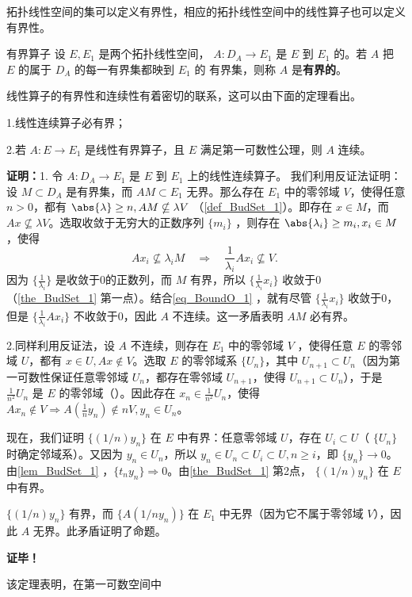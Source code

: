 

\cite{Ke1}拓扑线性空间的集可以定义有界性，相应的拓扑线性空间中的线性算子也可以定义有界性。

\begin{definition}{有界算子}
设 $E,E_1$ 是两个拓扑线性空间， $A:D_A\rightarrow E_1$ 是 $E$ 到 $E_1$ 的。若 $A$ 把 $E$ 的属于 $D_A$ 的每一有界集都映到 $E_1$ 的 有界集，则称 $A$ 是\textbf{有界的}。
\end{definition}

线性算子的有界性和连续性有着密切的联系，这可以由下面的定理看出。

\begin{theorem}{}
1.线性连续算子必有界；

2.若 $A:E\rightarrow E_1$ 是线性有界算子，且 $E$ 满足第一可数性公理，则 $A$ 连续。
\end{theorem}
\textbf{证明：}1. 令 $A:D_A\rightarrow E_1$ 是 $E$ 到 $E_1$ 上的线性连续算子。 我们利用反证法证明：设 $M\subset D_A$ 是有界集，而 $AM\subset E_1$ 无界。那么存在 $E_1$ 中的零邻域 $V$，使得任意 $n>0$，都有 $\abs{\lambda}\geq n,AM\nsubseteq\lambda V$ （\autoref{def_BudSet_1}）。即存在 $x\in M$，而 $Ax\nsubseteq \lambda V$。选取收敛于无穷大的正数序列 $\{m_i\}$ ，则存在 $\abs{\lambda_i}\geq m_i,x_i\in M$，使得 
\begin{equation}\label{eq_BoundO_1}
Ax_i\nsubseteq \lambda_iM\quad\Rightarrow\quad \frac{1}{\lambda_i}A x_i\nsubseteq V. ~
\end{equation}
因为 $\{\frac{1}{\lambda_i}\}$ 是收敛于0的正数列，而 $M$ 有界，所以 $\{\frac{1}{\lambda_i}x_i\}$ 收敛于0（\autoref{the_BudSet_1} 第一点）。结合\autoref{eq_BoundO_1} ，就有尽管 $\{\frac{1}{\lambda_i}x_i\}$ 收敛于0，但是 $\{\frac{1}{\lambda_i}A x_i\}$ 不收敛于0，因此 $A$ 不连续。这一矛盾表明 $AM$ 必有界。

2.同样利用反证法，设 $A$ 不连续，则存在 $E_1$ 中的零邻域 $V$ ，使得任意 $E$ 的零邻域 $U$，都有 $x\in U,Ax\notin V$。选取 $E$ 的零邻域系 $\{U_n\}$，其中 $U_{n+1}\subset U_n$（因为第一可数性保证任意零邻域 $U_n$，都存在零邻域 $U_{n+1}$，使得 $U_{n+1}\subset U_n$），于是 $\frac{1}{n^2} U_n$ 是 $E$ 的零邻域（）。因此存在 $x_n\in \frac{1}{n^2}U_n$，使得 $Ax_n\notin V\Rightarrow A (\frac{1}{n}y_n)\notin n V,y_n\in U_n$。

现在，我们证明 $\{(1/n) y_n\}$ 在 $E$ 中有界：任意零邻域 $U$，存在 $U_i\subset U$（ $\{U_n\}$  时确定邻域系）。又因为 $y_n\in U_n$，所以 $y_n\in U_n\subset U_i\subset U,n\geq i$，即 $\{y_n\}\rightarrow 0$。由\autoref{lem_BudSet_1} ，$\{t_ny_n\}\Rightarrow0$。由\autoref{the_BudSet_1} 第2点， $\{(1/n) y_n\}$ 在 $E$ 中有界。

$\{(1/n) y_n\}$ 有界，而 $\{A(1/n y_n)\}$ 在 $E_1$ 中无界（因为它不属于零邻域 $V$），因此 $A$ 无界。此矛盾证明了命题。

 
\textbf{证毕！}

该定理表明，在第一可数空间中
